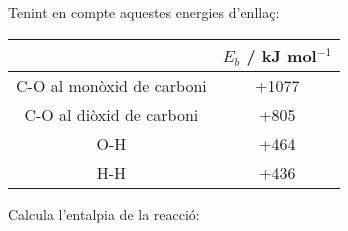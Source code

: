 \begin{exr}
Tenint en compte aquestes energies d'enllaç:

\begin{tabular}{cc}
& $E_b$ / kJ mol$^{-1}$ \\
\hline
C-O al monòxid de carboni & +1077 \\
C-O al diòxid de carboni & +805 \\
O-H & +464 \\
H-H & +436 \\
\hline
\end{tabular}

Calcula l'entalpia de la reacció:
\end{exr}